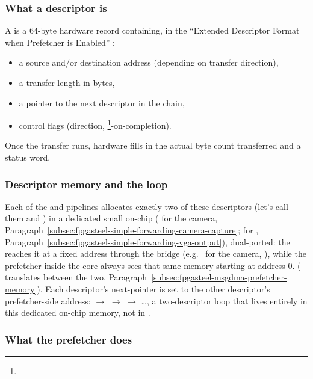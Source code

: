 \subsubsection{What a descriptor is}

A  is a 64-byte hardware record containing, in the ``Extended Descriptor Format when Prefetcher is Enabled'' \cite[Table 305, p.~379]{EP-IPUG}: 

\begin{itemize}
    \item a source and/or destination  address (depending on transfer direction),
    \item a transfer length in bytes,
    \item a pointer to the next descriptor in the chain,
    \item control flags (direction, \footnote{}-on-completion).
\end{itemize}

Once the transfer runs, hardware fills in the actual byte count transferred and a status word.

\subsubsection{Descriptor memory and the loop}

Each of the  and  pipelines allocates exactly two of these descriptors (let's call them  and ) in a dedicated small on-chip  ( for the camera, Paragraph~\ref{subsec:fpgasteel-simple-forwarding-camera-capture};  for , Paragraph~\ref{subsec:fpgasteel-simple-forwarding-vga-output}), dual-ported: the  reaches it at a fixed address through the  bridge (e.g.\  for the camera, ), while the prefetcher inside the  core always sees that same memory starting at address 0. ( translates between the two, Paragraph~\ref{subsec:fpgasteel-msgdma-prefetcher-memory}). Each descriptor's next-pointer is set to the other descriptor's prefetcher-side address:  $\rightarrow$  $\rightarrow$  $\rightarrow$ \ldots, a two-descriptor loop that lives entirely in this dedicated on-chip memory, not in .

\subsubsection{What the prefetcher does}

